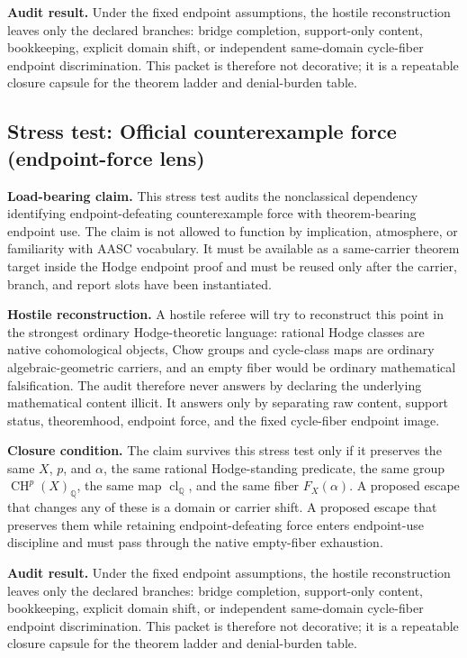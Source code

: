 \documentclass[11pt]{article}
\newcommand{\QQ}{\mathbb{Q}}
\newcommand{\CH}{\operatorname{CH}}
\newcommand{\clQ}{\operatorname{cl}_{\QQ}}
\begin{document}
\par\noindent\textbf{Audit result.} Under the fixed endpoint assumptions, the hostile reconstruction leaves only the declared branches: bridge completion, support-only content, bookkeeping, explicit domain shift, or independent same-domain cycle-fiber endpoint discrimination. This packet is therefore not decorative; it is a repeatable closure capsule for the theorem ladder and denial-burden table.


\subsection{Stress test: Official counterexample force (endpoint-force lens)}

\par\noindent\textbf{Load-bearing claim.} This stress test audits the nonclassical dependency identifying endpoint-defeating counterexample force with theorem-bearing endpoint use. The claim is not allowed to function by implication, atmosphere, or familiarity with AASC vocabulary. It must be available as a same-carrier theorem target inside the Hodge endpoint proof and must be reused only after the carrier, branch, and report slots have been instantiated.

\par\noindent\textbf{Hostile reconstruction.} A hostile referee will try to reconstruct this point in the strongest ordinary Hodge-theoretic language: rational Hodge classes are native cohomological objects, Chow groups and cycle-class maps are ordinary algebraic-geometric carriers, and an empty fiber would be ordinary mathematical falsification. The audit therefore never answers by declaring the underlying mathematical content illicit. It answers only by separating raw content, support status, theoremhood, endpoint force, and the fixed cycle-fiber endpoint image.

\par\noindent\textbf{Closure condition.} The claim survives this stress test only if it preserves the same $X$, $p$, and $\alpha$, the same rational Hodge-standing predicate, the same group $\CH^p(X)_\QQ$, the same map $\clQ$, and the same fiber $F_X(\alpha)$. A proposed escape that changes any of these is a domain or carrier shift. A proposed escape that preserves them while retaining endpoint-defeating force enters endpoint-use discipline and must pass through the native empty-fiber exhaustion.

\par\noindent\textbf{Audit result.} Under the fixed endpoint assumptions, the hostile reconstruction leaves only the declared branches: bridge completion, support-only content, bookkeeping, explicit domain shift, or independent same-domain cycle-fiber endpoint discrimination. This packet is therefore not decorative; it is a repeatable closure capsule for the theorem ladder and denial-burden table.
\end{document}

